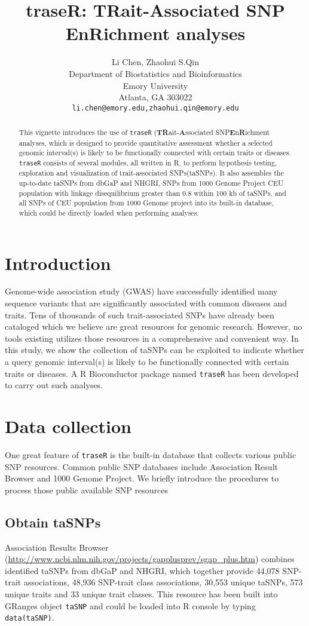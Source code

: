 \documentclass{article}
\author{Li Chen, Zhaohui S.Qin \\[1em]Department of Biostatistics and Bioinformatics\\ Emory University\\
  Atlanta, GA 303022 \\ [1em] \texttt{li.chen@emory.edu,zhaohui.qin@emory.edu}}
\title{\textsf{\textbf{traseR: TRait-Associated SNP EnRichment analyses}}}
\begin{document}
\maketitle
\tableofcontents



\begin{abstract}
This vignette introduces the use of {\tt traseR} 
({\bf TR}ait-{\bf A}ssociated  SNP{\bf E}n{\bf R}ichment analyses,
which is designed to provide quantitative assessment whether a selected genomic interval(s) is likely to be functionally connected with certain traits or diseases. 
{\tt traseR} consists of several modules, all written in R, to perform hypothesis testing, exploration and visualization of trait-associated SNPs(taSNPs). It also assembles the up-to-date taSNPs from dbGaP and NHGRI, SNPs from 1000 Genome Project CEU population with linkage disequilibrium greater than 0.8 within 100 kb of taSNPs, and all SNPs of CEU population from 1000 Genome project into its built-in database, which could be directly loaded when performing analyses. 
\end{abstract}

\section{Introduction}
Genome-wide association study (GWAS) have successfully identified many sequence variants that are significantly associated with common diseases and traits. Tens of thousands of such trait-associated SNPs have already been cataloged which we believe are great resources for genomic research. However, no tools existing utilizes those resources in a comprehensive and convenient way. In this study, we show the collection of taSNPs can be exploited to indicate whether a query genomic interval(s) is likely to be functionally connected with certain traits or diseases. A R Bioconductor package named {\tt traseR}  has been developed to carry out such analyses.

\section{Data collection}
 One great feature of {\tt traseR} is the built-in database that collects various public SNP resources. Common public SNP databases include Association Result Browser and 1000 Genome Project. We briefly introduce the procedures to process those public available SNP resources 


\subsection{Obtain taSNPs}
Association Results Browser
(\url{http://www.ncbi.nlm.nih.gov/projects/gapplusprev/sgap_plus.htm}) combines identified taSNPs from dbGaP and NHGRI, which together provide 44,078 SNP-trait associations, 48,936 SNP-trait class associations, 30,553 unique taSNPs, 573 unique traits and 33 unique trait classes. This resource has been built into GRanges object \texttt{taSNP} and could be loaded into R console by typing \texttt{data(taSNP)}.
\end{document}
